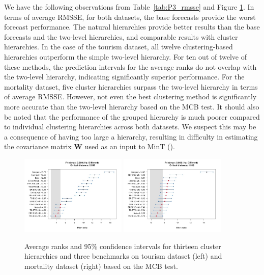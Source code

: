 \documentclass[a4paper,review,12pt,authoryear]{elsarticle}
\begin{document}
We have the following observations from Table~\ref{tab:P3_rmsse} and Figure \ref{fig:P3_mcb_benchmark}. In terms of average RMSSE, for both datasets, the base forecasts provide the worst forecast performance. The natural hierarchies provide better results than the base forecasts and the two-level hierarchies, and comparable results with cluster hierarchies. In the case of the tourism dataset, all twelve clustering-based hierarchies outperform the simple two-level hierarchy. For ten out of twelve of these methods, the prediction intervals for the average ranks do not overlap with the two-level hierarchy, indicating significantly superior performance.
For the mortality dataset, five cluster hierarchies surpass the two-level hierarchy in terms of average RMSSE. However,  not even the best clustering method is significantly more accurate than the two-level hierarchy based on the MCB test. {It should also be noted that the performance of the grouped hierarchy is much poorer compared to individual clustering hierarchies across both datasets. We suspect this may be a consequence of having too large a hierarchy, resulting in difficulty in estimating the covariance matrix $\boldsymbol{W}$ used as an input to MinT (\citealp{pritulargaStochasticCoherencyForecast2021}).}

\begin{figure}[h!]
    \centering
    \vspace{0.1in}
    \includegraphics[width=0.45\textwidth]{../figures/Figure4_tourism_mcb_benchmarks.jpg}
    \includegraphics[width=0.45\textwidth]{../figures/Figure4_mortality_mcb_benchmarks.jpg}
    \caption{\label{fig:P3_mcb_benchmark}Average ranks and 95\% confidence intervals for { thirteen} cluster hierarchies and three benchmarks on tourism dataset (left) and mortality dataset (right) based on the MCB test.}
\end{figure}
\end{document}
